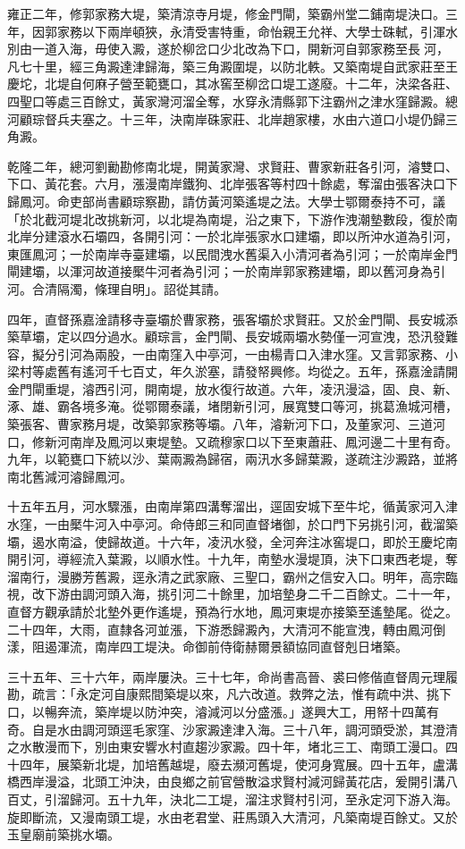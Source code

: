 \begin{pinyinscope}
雍正二年，修郭家務大堤，築清涼寺月堤，修金門閘，築霸州堂二鋪南堤決口。三年，因郭家務以下兩岸頓狹，永清受害特重，命怡親王允祥、大學士硃軾，引渾水別由一道入海，毋使入澱，遂於柳岔口少北改為下口，開新河自郭家務至長河，凡七十里，經三角澱達津歸海，築三角澱圍堤，以防北軼。又築南堤自武家莊至王慶坨，北堤自何麻子營至範甕口，其冰窖至柳岔口堤工遂廢。十二年，決梁各莊、四聖口等處三百餘丈，黃家灣河溜全奪，水穿永清縣郭下注霸州之津水窪歸澱。總河顧琮督兵夫塞之。十三年，決南岸硃家莊、北岸趙家樓，水由六道口小堤仍歸三角澱。

乾隆二年，總河劉勷勘修南北堤，開黃家灣、求賢莊、曹家新莊各引河，濬雙口、下口、黃花套。六月，漲漫南岸鐵狗、北岸張客等村四十餘處，奪溜由張客決口下歸鳳河。命吏部尚書顧琮察勘，請仿黃河築遙堤之法。大學士鄂爾泰持不可，議「於北截河堤北改挑新河，以北堤為南堤，沿之東下，下游作洩潮墊數段，復於南北岸分建滾水石壩四，各開引河：一於北岸張家水口建壩，即以所沖水道為引河，東匯鳳河；一於南岸寺臺建壩，以民間洩水舊渠入小清河者為引河；一於南岸金門閘建壩，以渾河故道接檿牛河者為引河；一於南岸郭家務建壩，即以舊河身為引河。合清隔濁，條理自明」。詔從其請。

四年，直督孫嘉淦請移寺臺壩於曹家務，張客壩於求賢莊。又於金門閘、長安城添築草壩，定以四分過水。顧琮言，金門閘、長安城兩壩水勢僅一河宣洩，恐汛發難容，擬分引河為兩股，一由南窪入中亭河，一由楊青口入津水窪。又言郭家務、小梁村等處舊有遙河千七百丈，年久淤塞，請發帑興修。均從之。五年，孫嘉淦請開金門閘重堤，濬西引河，開南堤，放水復行故道。六年，凌汛漫溢，固、良、新、涿、雄、霸各境多淹。從鄂爾泰議，堵閉新引河，展寬雙口等河，挑葛漁城河槽，築張客、曹家務月堤，改築郭家務等壩。八年，濬新河下口，及董家河、三道河口，修新河南岸及鳳河以東堤墊。又疏穆家口以下至東蕭莊、鳳河邊二十里有奇。九年，以範甕口下統以沙、葉兩澱為歸宿，兩汛水多歸葉澱，遂疏注沙澱路，並將南北舊減河濬歸鳳河。

十五年五月，河水驟漲，由南岸第四溝奪溜出，逕固安城下至牛坨，循黃家河入津水窪，一由檿牛河入中亭河。命侍郎三和同直督堵御，於口門下另挑引河，截溜築壩，遏水南溢，使歸故道。十六年，凌汛水發，全河奔注冰窖堤口，即於王慶坨南開引河，導經流入葉澱，以順水性。十九年，南墊水漫堤頂，決下口東西老堤，奪溜南行，漫勝芳舊澱，逕永清之武家廠、三聖口，霸州之信安入口。明年，高宗臨視，改下游由調河頭入海，挑引河二十餘里，加培墊身二千二百餘丈。二十一年，直督方觀承請於北墊外更作遙堤，預為行水地，鳳河東堤亦接築至遙墊尾。從之。二十四年，大雨，直隸各河並漲，下游悉歸澱內，大清河不能宣洩，轉由鳳河倒漾，阻遏渾流，南岸四工堤決。命御前侍衛赫爾景額協同直督剋日堵築。

三十五年、三十六年，兩岸屢決。三十七年，命尚書高晉、裘曰修偕直督周元理履勘，疏言：「永定河自康熙間築堤以來，凡六改道。救弊之法，惟有疏中洪、挑下口，以暢奔流，築岸堤以防沖突，濬減河以分盛漲。」遂興大工，用帑十四萬有奇。自是水由調河頭逕毛家窪、沙家澱達津入海。三十八年，調河頭受淤，其澄清之水散漫而下，別由東安響水村直趨沙家澱。四十年，堵北三工、南頭工漫口。四十四年，展築新北堤，加培舊越堤，廢去瀕河舊堤，使河身寬展。四十五年，盧溝橋西岸漫溢，北頭工沖決，由良鄉之前官營散溢求賢村減河歸黃花店，爰開引溝八百丈，引溜歸河。五十九年，決北二工堤，溜注求賢村引河，至永定河下游入海。旋即斷流，又漫南頭工堤，水由老君堂、莊馬頭入大清河，凡築南堤百餘丈。又於玉皇廟前築挑水壩。


\end{pinyinscope}
